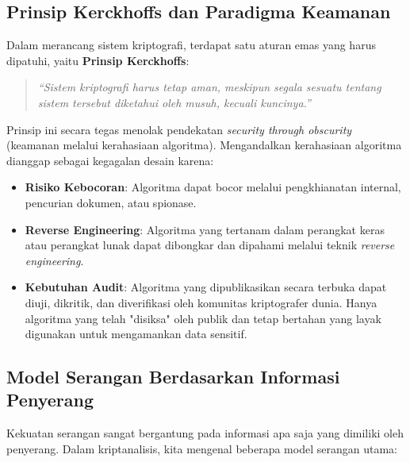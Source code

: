 \subsection{Prinsip Kerckhoffs dan Paradigma Keamanan}

Dalam merancang sistem kriptografi, terdapat satu aturan emas yang harus dipatuhi, yaitu \textbf{Prinsip Kerckhoffs}:
\begin{quote}
    \textit{``Sistem kriptografi harus tetap aman, meskipun segala sesuatu tentang sistem tersebut diketahui oleh musuh, kecuali kuncinya.''}
\end{quote}

Prinsip ini secara tegas menolak pendekatan \textit{security through obscurity} (keamanan melalui kerahasiaan algoritma). Mengandalkan kerahasiaan algoritma dianggap sebagai kegagalan desain karena:
\begin{itemize}
    \item \textbf{Risiko Kebocoran}: Algoritma dapat bocor melalui pengkhianatan internal, pencurian dokumen, atau spionase.
    \item \textbf{Reverse Engineering}: Algoritma yang tertanam dalam perangkat keras atau perangkat lunak dapat dibongkar dan dipahami melalui teknik \textit{reverse engineering}.
    \item \textbf{Kebutuhan Audit}: Algoritma yang dipublikasikan secara terbuka dapat diuji, dikritik, dan diverifikasi oleh komunitas kriptografer dunia. Hanya algoritma yang telah "disiksa" oleh publik dan tetap bertahan yang layak digunakan untuk mengamankan data sensitif.
\end{itemize}

\subsection{Model Serangan Berdasarkan Informasi Penyerang}

Kekuatan serangan sangat bergantung pada informasi apa saja yang dimiliki oleh penyerang. Dalam kriptanalisis, kita mengenal beberapa model serangan utama:

